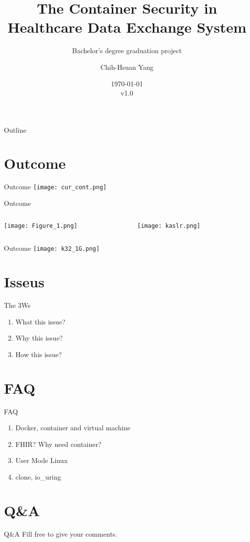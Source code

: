 \documentclass{beamer}
\title{The Container Security in Healthcare Data Exchange System}
\subtitle{Bachelor's degree graduation project}
\author{Chih-Hsuan Yang}
\institute{National Sun Yat-sen University\\
Advisor: Chun-I Fan
}
\date{\today\\v1.0}
\begin{document}
\begin{frame}
    \titlepage
\end{frame}

\begin{frame}{Outline}
    \begin{multicols}{2}
        \tableofcontents
    \end{multicols}
\end{frame}

\section{Outcome}
\begin{frame}{Outcome}
    \centering\texttt{[image: cur\_cont.png]}
\end{frame}

\begin{frame}{Outcome}
    \begin{columns}
        \begin{column}{0.5\textwidth}
            \centering\texttt{[image: Figure\_1.png]}
        \end{column}
        \begin{column}{.5\textwidth}
            \centering\texttt{[image: kaslr.png]}
        \end{column}
    \end{columns}
\end{frame}

\begin{frame}{Outcome}
    \centering\texttt{[image: k32\_1G.png]}
\end{frame}

\section{Isseus}
\begin{frame}{The 3Ws}
    \begin{enumerate}
        \item What this issue?
        \item Why this issue?
        \item How this issue?
    \end{enumerate}
\end{frame}

\section{FAQ}
\begin{frame}{FAQ}
    \begin{enumerate}
        \item Docker, container and virtual machine
        \item FHIR? Why need container?
        \item User Mode Linux
        \item clone, io\_uring
    \end{enumerate}
\end{frame}

\section{Q\&A}
\begin{frame}{Q\&A}
    \centering
    \Large Fill free to give your comments.
\end{frame}
\end{document}
